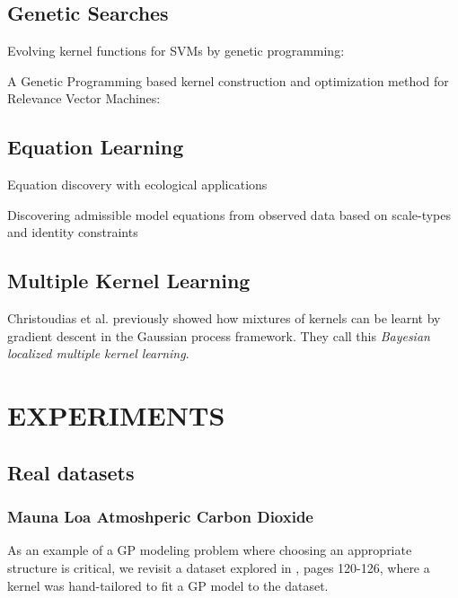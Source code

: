 \documentclass[twoside]{article}
\begin{document}
\subsection{Genetic Searches}

Evolving kernel functions for SVMs by genetic programming: \cite{diosan2007evolving}

A Genetic Programming based kernel construction and optimization method for Relevance Vector Machines: \cite{bing2010gp}

\subsection{Equation Learning}

Equation discovery with ecological applications \cite{dzeroski1999equation}

Discovering admissible model equations from observed data based on scale-types and identity constraints \cite{washio1999discovering}

\subsection{Multiple Kernel Learning}

Christoudias et al.\cite{christoudias2009bayesian} previously showed how mixtures of kernels can be learnt by gradient descent in the Gaussian process framework.  They call this \emph{Bayesian localized multiple kernel learning}.


\section{EXPERIMENTS}

\subsection{Real datasets}

\subsubsection{Mauna Loa Atmoshperic Carbon Dioxide}

As an example of a GP modeling problem where choosing an appropriate structure is critical, we revisit a dataset explored in \cite{rasmussen38gaussian}, pages 120-126, where a kernel was hand-tailored to fit a GP model to the dataset.
\end{document}
